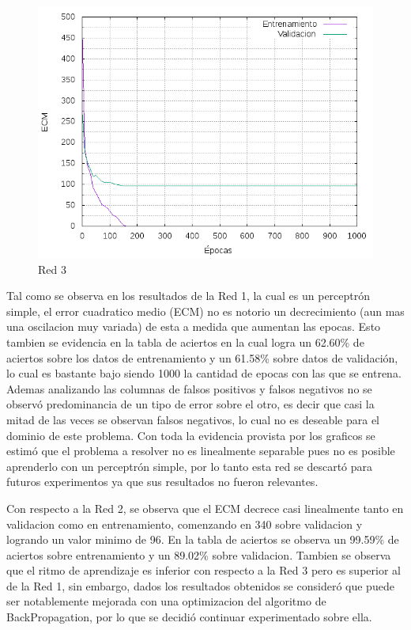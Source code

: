 \begin{figure}[H]
  \includegraphics[width=125mm]{imagenes/ej1/ex_1-1_red_11-21-1_errors.png}
  \caption{Red 3}
\end{figure}


 Tal como se observa en los resultados de la Red 1, la cual es un perceptrón simple, el error cuadratico medio (ECM) no es notorio un decrecimiento (aun mas una oscilacion
 muy variada) de esta a medida que aumentan las epocas.
 Esto tambien se evidencia en la tabla de aciertos en la cual logra un 62.60\% de aciertos sobre los datos de entrenamiento y un 61.58\% sobre datos de validación,
 lo cual es bastante bajo siendo 1000 la cantidad de epocas con las que se entrena. Ademas analizando las columnas de falsos positivos y falsos negativos no se observó
 predominancia de un tipo de error sobre el otro, es decir que casi la mitad de las veces se observan falsos negativos, lo cual no es deseable para el dominio de este problema.
 Con toda la evidencia provista por los graficos se estimó que el problema a resolver no es linealmente separable pues no es posible
 aprenderlo con un perceptrón simple, por lo tanto esta red se descartó para futuros experimentos ya que sus resultados no fueron relevantes.

 Con respecto a la Red 2, se observa que el ECM decrece casi linealmente tanto en validacion como en entrenamiento, comenzando en 340 sobre validacion y
 logrando un valor minimo de 96. En la tabla de aciertos se observa un 99.59\% de aciertos sobre entrenamiento y un 89.02\% sobre validacion. Tambien se observa
 que el ritmo de aprendizaje es inferior con respecto a la Red 3 pero es superior al de la Red 1, sin embargo, dados los resultados obtenidos se consideró
 que puede ser notablemente mejorada con una optimizacion del algoritmo de BackPropagation, por lo que se decidió continuar experimentado sobre ella.

